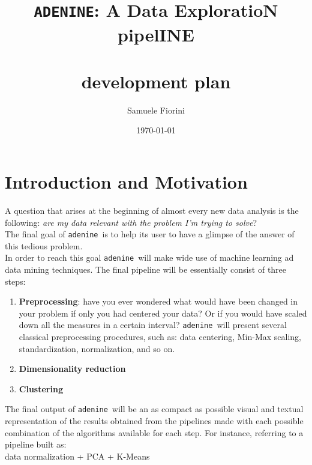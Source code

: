 \documentclass[paper=a4, fontsize=10pt]{scrartcl} %
\title{	
\normalfont \normalsize
\huge{\tt ADENINE}: A Data ExploratioN pipelINE \\
\horrule{2pt} \\[0.5cm] %
development plan \\ %
}
\author{Samuele Fiorini} %
\date{\normalsize\today} %
\numberwithin{equation}{section} %
\numberwithin{figure}{section} %
\numberwithin{table}{section} %
\newcommand{\adenine}{{\tt adenine}~}
\begin{document}
\maketitle %


\section{Introduction and Motivation}

A question that arises at the beginning of almost every new data analysis is
the following:  {\sl are my data relevant with the problem I'm trying to
solve}? \\

The final goal of \adenine is to help its user to have a glimpse of the answer of
this tedious problem. \\

In order to reach this goal \adenine will make wide use of machine learning ad
data mining techniques. The final pipeline will be essentially consist of three steps:

\begin{enumerate}
	
	\item {\bf Preprocessing}: have you ever wondered what would have been changed in 
	your problem if only you had centered your data? Or if you would have scaled down all the
	measures in a certain interval? \adenine will present several classical preprocessing
	procedures, such as: data centering, Min-Max scaling, standardization, normalization, and so on.
	
	\item {\bf Dimensionality reduction}
	
	\item {\bf Clustering}

\end{enumerate}

The final output of \adenine will be an as compact as possible visual and textual representation of 
the results obtained from the pipelines made with each possible combination of the algorithms
available for each step. For instance, referring to a pipeline built as: \\

data normalization  + PCA + K-Means \\
\end{document}
